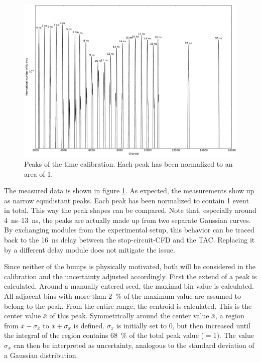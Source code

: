 \documentclass[
	paper=A4,
	parskip=full,
	chapterprefix=true,
	11pt,
	headings=normal,
	bibliography=totoc,
	listof=totoc,
	titlepage=on,
]{scrreprt}
\begin{document}
\begin{figure}
	\centering
	\includegraphics{calibration_peaks}
	\caption{Peaks of the time calibration. Each peak has been normalized to an area of \num{1}.}
	\label{fig:calibration_raw}
\end{figure}

The measured data is shown in figure \ref{fig:calibration_raw}. As expected, the measurements show up as narrow equidistant peaks. Each peak has been normalized to contain \num{1} event in total. This way the peak shapes can be compared. Note that, especially around \SIrange{4}{13}{\nano\second}, the peaks are actually made up from two separate Gaussian curves. By exchanging modules from the experimental setup, this behavior can be traced back to the \SI{16}{\nano\second} delay between the stop-circuit-CFD and the TAC. Replacing it by a different delay module does not mitigate the issue.

Since neither of the bumps is physically motivated, both will be considered in the calibration and the uncertainty adjusted accordingly.
First the extend of a peak is calculated. Around a manually entered seed, the maximal bin value is calculated. All adjacent bins with more than \SI{2}{\percent} of the maximum value are assumed to belong to the peak. From the entire range, the centroid is calculated. This is the center value $\bar{x}$ of this peak. Symmetrically around the center value $\bar{x}$, a region from $\bar{x}-\sigma_x$ to $\bar{x}+\sigma_x$ is defined. $\sigma_x$ is initially set to \num{0}, but then increased until the integral of the region contains \SI{68}{\percent} of the total peak value ($ = \num{1}$). The value $\sigma_x$ can then be interpreted as uncertainty, analogous to the standard deviation of a Gaussian distribution.
\end{document}
